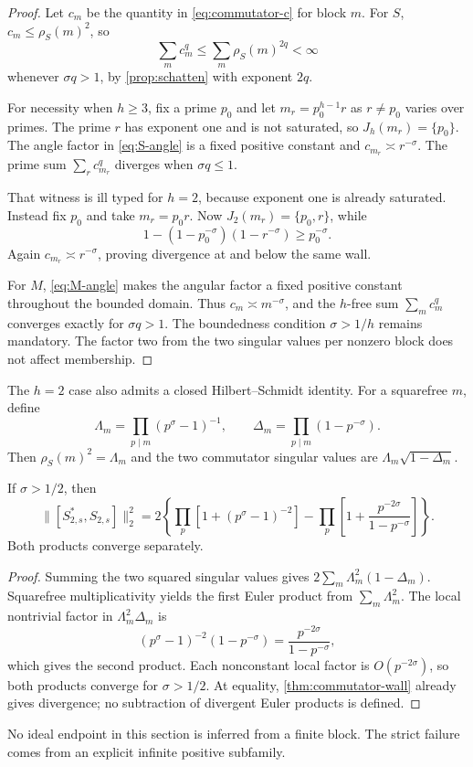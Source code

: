 \begin{proof}
Let $c_m$ be the quantity in \cref{eq:commutator-c} for block $m$.
For $S$, $c_m\le\rho_S(m)^2$, so
\[
  \sum_m c_m^q\le\sum_m\rho_S(m)^{2q}<\infty
\]
whenever $\sigma q>1$, by \cref{prop:schatten} with exponent $2q$.

For necessity when $h\ge3$, fix a prime $p_0$ and let
$m_r=p_0^{h-1}r$ as $r\ne p_0$ varies over primes.  The prime $r$ has
exponent one and is not saturated, so $J_h(m_r)=\{p_0\}$.  The angle
factor in \cref{eq:S-angle} is a fixed positive constant and
$c_{m_r}\asymp r^{-\sigma}$.  The prime sum
$\sum_r c_{m_r}^q$ diverges when $\sigma q\le1$.

That witness is ill typed for $h=2$, because exponent one is already
saturated.  Instead fix $p_0$ and take $m_r=p_0r$.  Now
$J_2(m_r)=\{p_0,r\}$, while
\[
  1-(1-p_0^{-\sigma})(1-r^{-\sigma})\ge p_0^{-\sigma}.
\]
Again $c_{m_r}\asymp r^{-\sigma}$, proving divergence at and below the
same wall.

For $M$, \cref{eq:M-angle} makes the angular factor a fixed positive
constant throughout the bounded domain.  Thus $c_m\asymp m^{-\sigma}$,
and the $h$-free sum $\sum_mc_m^q$ converges exactly for
$\sigma q>1$.  The boundedness condition $\sigma>1/h$ remains mandatory.
The factor two from the two singular values per nonzero block does not
affect membership.
\end{proof}

The $h=2$ case also admits a closed Hilbert--Schmidt identity.  For a
squarefree $m$, define
\[
  \Lambda_m=\prod_{p\mid m}(p^\sigma-1)^{-1},
  \qquad
  \Delta_m=\prod_{p\mid m}(1-p^{-\sigma}).
\]
Then $\rho_S(m)^2=\Lambda_m$ and the two commutator singular values are
$\Lambda_m\sqrt{1-\Delta_m}$.

\begin{proposition}[$h=2$ Euler control]
\label{prop:h2-euler-control}
If $\sigma>1/2$, then
\begin{equation}
  \|[S_{2,s}^*,S_{2,s}]\|_2^2
  =2\left\{
    \prod_p\left[1+(p^\sigma-1)^{-2}\right]
    -\prod_p\left[1+\frac{p^{-2\sigma}}{1-p^{-\sigma}}\right]
    \right\}.
  \label{eq:h2-HS}
\end{equation}
Both products converge separately.
\end{proposition}

\begin{proof}
Summing the two squared singular values gives
$2\sum_m\Lambda_m^2(1-\Delta_m)$.  Squarefree multiplicativity yields
the first Euler product from $\sum_m\Lambda_m^2$.  The local nontrivial
factor in $\Lambda_m^2\Delta_m$ is
\[
  (p^\sigma-1)^{-2}(1-p^{-\sigma})
  =\frac{p^{-2\sigma}}{1-p^{-\sigma}},
\]
which gives the second product.  Each nonconstant local factor is
$O(p^{-2\sigma})$, so both products converge for $\sigma>1/2$.
At equality, \cref{thm:commutator-wall} already gives divergence; no
subtraction of divergent Euler products is defined.
\end{proof}

No ideal endpoint in this section is inferred from a finite block.  The
strict failure comes from an explicit infinite positive subfamily.

